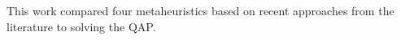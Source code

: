 This work compared four metaheuristics based on recent approaches from the literature to solving the QAP.
